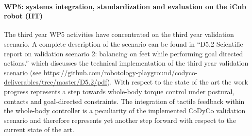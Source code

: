 
\paragraph*{WP5: systems integration, standardization and evaluation on the iCub robot (IIT)}

The third year WP5 activities have concentrated on the third year validation scenario. A complete
description of the scenario can be found in ``D5.2 Scientific report on validation scenario 2:
balancing on feet while performing goal directed actions.'' which discusses the technical
implementation of the third year validation scenario (see
\url{https://github.com/robotology-playground/codyco-deliverables/tree/master/D5.2/pdf}). With
respect to the state of the art the work progress represents a step towards whole-body torque
control under postural, contacts and goal-directed constraints. The integration of tactile
feedback within the whole-body controller is a peculiarity of the implemented CoDyCo validation
scenario and therefore represents yet another step forward with respect to the current state of
the art.
